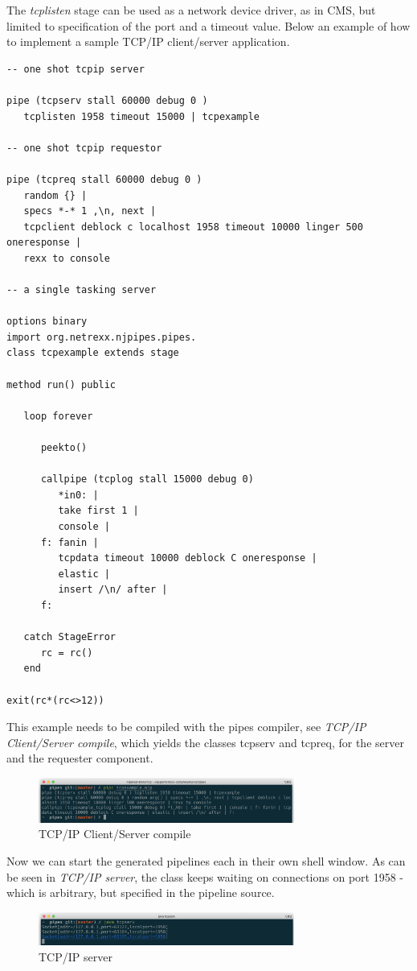 The \emph{tcplisten} stage can be used as a network device driver, as
in CMS, but limited to specification of the port and a timeout value. Below an example of how to implement a sample TCP/IP
client/server application.
\begin{lstlisting}
-- one shot tcpip server

pipe (tcpserv stall 60000 debug 0 )
   tcplisten 1958 timeout 15000 | tcpexample

-- one shot tcpip requestor

pipe (tcpreq stall 60000 debug 0 )
   random {} |
   specs *-* 1 ,\n, next |
   tcpclient deblock c localhost 1958 timeout 10000 linger 500 oneresponse |
   rexx to console

-- a single tasking server

options binary
import org.netrexx.njpipes.pipes.
class tcpexample extends stage

method run() public

   loop forever

      peekto()

      callpipe (tcplog stall 15000 debug 0)
         *in0: |
         take first 1 |
         console |
      f: fanin |
         tcpdata timeout 10000 deblock C oneresponse |
         elastic |
         insert /\n/ after |
      f:

   catch StageError
      rc = rc()
   end

exit(rc*(rc<>12))
\end{lstlisting}
This example needs to be compiled with the pipes compiler, see
\emph{TCP/IP Client/Server compile}, which yields the classes tcpserv
and tcpreq, for the server and the requester component. 
\begin{figure}[h]
  \includegraphics[width=0.75\textwidth]{images/tcpcompile.png}
  \caption{TCP/IP Client/Server compile}
  \label{fig:tcpcompile}
\end{figure}

Now we can start the generated pipelines each in their own shell
window. As can be seen in \emph{TCP/IP server}, the class keeps
waiting on connections on port 1958 - which is arbitrary, but
specified in the pipeline source.

\begin{figure}[h]
  \includegraphics[width=0.75\textwidth]{images/tcpserv.png}
  \caption{TCP/IP server}
  \label{fig:tcpcompile}
\end{figure}

